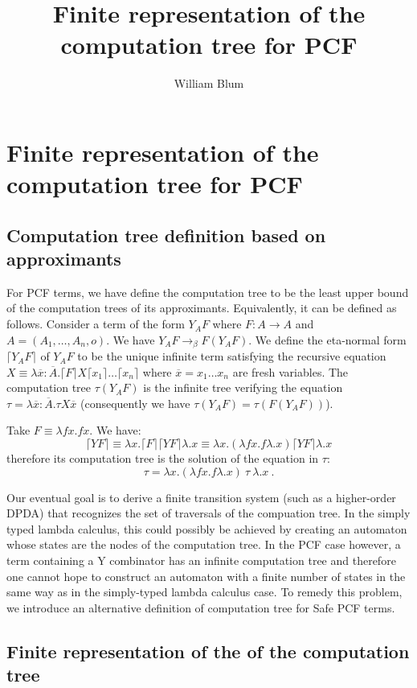 \documentclass{article}
\author{William Blum}
\title{Finite representation of the computation tree for PCF}
\newcommand{\aux}[1]{\lceil #1\rceil}
\newcommand{\betared}{\rightarrow_\beta}
\newcommand{\syneq}{\equiv}
\begin{document}
\maketitle

\section{Finite representation of the computation tree for PCF}

\subsection{Computation tree definition based on approximants}
For PCF terms, we have define the computation tree to be the least upper bound of the computation trees of its approximants. Equivalently, it can be defined as follows. Consider a term of the form $Y_A F$ where $F:A\rightarrow A$ and $A = (A_1,\ldots,A_n,o)$.
We have $Y_A F \betared F (Y_A F)$.
We define the eta-normal form $\aux{Y_A F}$ of $Y_A F$ to be the unique infinite term satisfying the recursive equation $X \syneq \lambda \overline{x}: \overline{A} . \aux{F} X \aux{x_1} \ldots \aux{x_n} $
where $\overline{x} = x_1 \ldots x_n$ are fresh variables.
The computation tree $\tau(Y_A F)$ is the infinite tree verifying the equation
$\tau =  \lambda \overline{x}: \overline{A} . \tau X \overline{x}$ (consequently we have $\tau(Y_A F) = \tau(F (Y_A F))$).

Take $F \syneq \lambda f x. f x$. We have:
$$\aux{Y F} \syneq \lambda x . \aux{F} \aux{Y F} \lambda.x \syneq \lambda x. (\lambda f x. f \lambda.x ) \aux{Y F} \lambda.x$$ therefore its computation tree is the solution of the equation in $\tau$: $$\tau = \lambda x . (\lambda f x. f \lambda.x) \ \tau \ \lambda.x \ .$$


Our eventual goal is to derive a finite transition system (such as a
higher-order DPDA) that recognizes the set of traversals of the
compuation tree. In the simply typed lambda calculus, this could
possibly be achieved by creating an automaton whose states are the
nodes of the computation tree. In the PCF case however, a term
containing a Y combinator has an infinite computation tree and
therefore one cannot hope to
 construct an automaton with a finite number of states in the same way as in the
simply-typed lambda calculus case.
To remedy this problem, we introduce an alternative definition of computation tree for Safe PCF terms.

\subsection{Finite representation of the of the computation tree}
\end{document}
